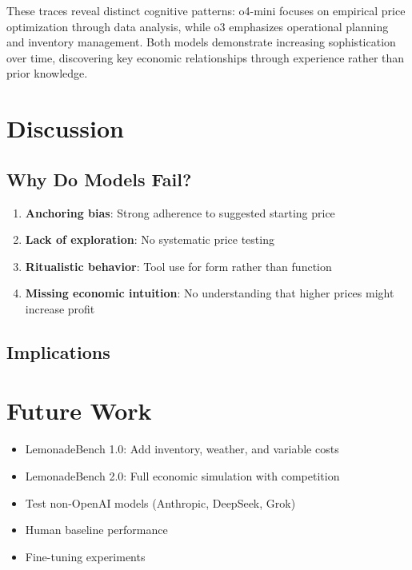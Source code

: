 \documentclass[11pt]{article}
\begin{document}

These traces reveal distinct cognitive patterns: o4-mini focuses on empirical price optimization through data analysis, while o3 emphasizes operational planning and inventory management. Both models demonstrate increasing sophistication over time, discovering key economic relationships through experience rather than prior knowledge.

\section{Discussion}

\subsection{Why Do Models Fail?}

\begin{enumerate}
    \item \textbf{Anchoring bias}: Strong adherence to suggested starting price
    \item \textbf{Lack of exploration}: No systematic price testing
    \item \textbf{Ritualistic behavior}: Tool use for form rather than function
    \item \textbf{Missing economic intuition}: No understanding that higher prices might increase profit
\end{enumerate}

\subsection{Implications}


\section{Future Work}

\begin{itemize}
    \item LemonadeBench 1.0: Add inventory, weather, and variable costs
    \item LemonadeBench 2.0: Full economic simulation with competition
    \item Test non-OpenAI models (Anthropic, DeepSeek, Grok)
    \item Human baseline performance
    \item Fine-tuning experiments
\end{itemize}
\end{document}
